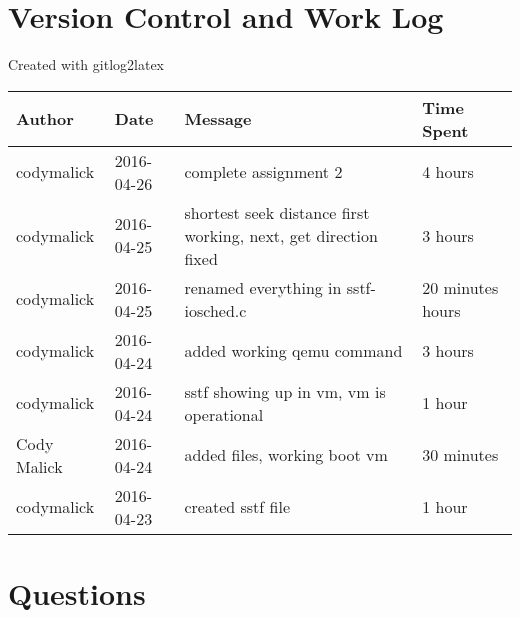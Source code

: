 \documentclass[10pt,letterpaper]{article}
\begin{document}
\section{Version Control and Work Log}
Created with gitlog2latex
\begin{center}
\begin{longtabu} to \textwidth {|
    X[4,l]|
    X[3,c]|
    X[8,l]|}
    \hline
    \textbf{Author} & \textbf{Date} & \textbf{Message} & \textbf{Time Spent} \\ \hline
codymalick & 2016-04-26 & complete assignment 2 & 4 hours \\ \hline
codymalick & 2016-04-25 & shortest seek distance first working, next, get direction fixed  & 3 hours \\ \hline
codymalick & 2016-04-25 & renamed everything in sstf-iosched.c  & 20 minutes hours \\ \hline
codymalick & 2016-04-24 & added working qemu command & 3 hours \\ \hline
codymalick & 2016-04-24 & sstf showing up in vm, vm is operational & 1 hour \\ \hline
Cody Malick & 2016-04-24 & added files, working boot vm & 30 minutes \\ \hline
codymalick & 2016-04-23 & created sstf file & 1 hour \\ \hline

\end{longtabu}
\end{center}

\section{Questions}
\end{document}
